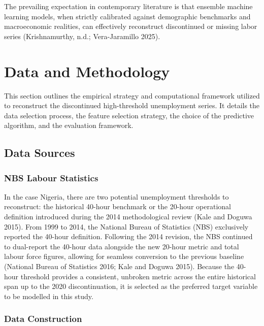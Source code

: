 \documentclass[
  letterpaper,
  DIV=11,
  numbers=noendperiod]{scrartcl}
\begin{document}
The prevailing expectation in contemporary literature is that ensemble
machine learning models, when strictly calibrated against demographic
benchmarks and macroeconomic realities, can effectively reconstruct
discontinued or missing labor series (Krishnamurthy, n.d.;
Vera-Jaramillo 2025).

\section{Data and Methodology}\label{data-and-methodology}

This section outlines the empirical strategy and computational framework
utilized to reconstruct the discontinued high-threshold unemployment
series. It details the data selection process, the feature selection
strategy, the choice of the predictive algorithm, and the evaluation
framework.

\subsection{Data Sources}\label{data-sources}

\subsubsection{NBS Labour Statistics}\label{nbs-labour-statistics}

In the case Nigeria, there are two potential unemployment thresholds to
reconstruct: the historical 40-hour benchmark or the 20-hour operational
definition introduced during the 2014 methodological review (Kale and
Doguwa 2015). From 1999 to 2014, the National Bureau of Statistics (NBS)
exclusively reported the 40-hour definition. Following the 2014
revision, the NBS continued to dual-report the 40-hour data alongside
the new 20-hour metric and total labour force figures, allowing for
seamless conversion to the previous baseline (National Bureau of
Statistics 2016; Kale and Doguwa 2015). Because the 40-hour threshold
provides a consistent, unbroken metric across the entire historical span
up to the 2020 discontinuation, it is selected as the preferred target
variable to be modelled in this study.

\subsubsection{Data Construction}\label{data-construction}
\end{document}
